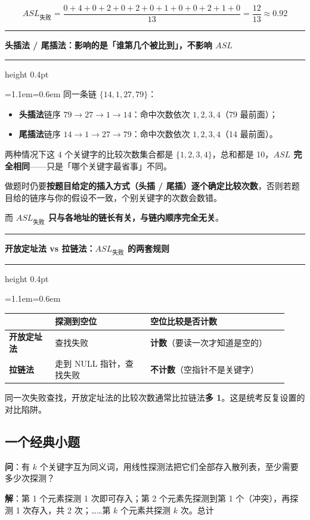 \documentclass[11pt,openany,UTF8]{ctexbook}
\newcommand{\callouthead}[2]{%
  \par\addvspace{7pt}\noindent
  {\color{#1}\rule[-0.15em]{3pt}{1.05em}}\hspace{0.5em}%
  {\bfseries\color{#1}#2}\par\nobreak\vspace{-0.35em}%
  {\color{rulesep}\hrule height 0.4pt}\nobreak\vspace{0.45em}%
  \begingroup\small\setlength{\parindent}{0pt}%
  \leftskip=1.1em\rightskip=0.6em\noindent\ignorespaces}
\newcommand{\calloutend}{\par\endgroup\addvspace{7pt}}
\newenvironment{callkey}[1]{\callouthead{keybar}{#1}}{\calloutend}
\newenvironment{callwarn}[1]{\callouthead{warnbar}{#1}}{\calloutend}
\begin{document}
\[ASL_{失败}=\frac{0+4+0+2+0+2+0+1+0+0+2+1+0}{13}=\frac{12}{13}\approx0.92\]

\begin{callwarn}{头插法 / 尾插法：影响的是「谁第几个被比到」，不影响 $ASL$}
同一条链 $\{14,1,27,79\}$：

\begin{itemize}
\item \textbf{头插法}链序 $79\to27\to1\to14$：命中次数依次 $1,2,3,4$（79 最前面）；
\item \textbf{尾插法}链序 $14\to1\to27\to79$：命中次数依次 $1,2,3,4$（14 最前面）。
\end{itemize}
两种情况下这 4 个关键字的比较次数集合都是 $\{1,2,3,4\}$，总和都是 10，\textbf{$ASL$ 完全相同}——只是「哪个关键字最省事」不同。

做题时仍要\textbf{按题目给定的插入方式（头插 / 尾插）逐个确定比较次数}，否则若题目给的链序与你的假设不一致，个别关键字的次数会数错。

而 \textbf{$ASL_{失败}$ 只与各地址的链长有关，与链内顺序完全无关}。

\end{callwarn}

\begin{callkey}{开放定址法 vs 拉链法：$ASL_{失败}$ 的两套规则}
\begingroup\small\setlength{\tabcolsep}{4.0pt}
\begin{longtable}{@{}L{0.1569\linewidth}L{0.3139\linewidth}L{0.4577\linewidth}@{}}
\toprule
\textbf{} & \textbf{探测到空位} & \textbf{空位比较是否计数} \\
\midrule
\endhead
\textbf{开放定址法} & 查找失败 & \textbf{计数}（要读一次才知道是空的） \\
\textbf{拉链法} & 走到 NULL 指针，查找失败 & \textbf{不计数}（空指针不是关键字） \\
\bottomrule
\end{longtable}
\endgroup

同一次失败查找，开放定址法的比较次数通常比拉链法\textbf{多 1}。这是统考反复设置的对比陷阱。

\end{callkey}

\subsection{一个经典小题}

\textbf{问}：有 $k$ 个关键字互为同义词，用线性探测法把它们全部存入散列表，至少需要多少次探测？

\textbf{解}：第 1 个元素探测 1 次即可存入；第 2 个元素先探测到第 1 个（冲突），再探测 1 次存入，共 2 次；……第 $k$ 个元素共探测 $k$ 次。总计
\end{document}

